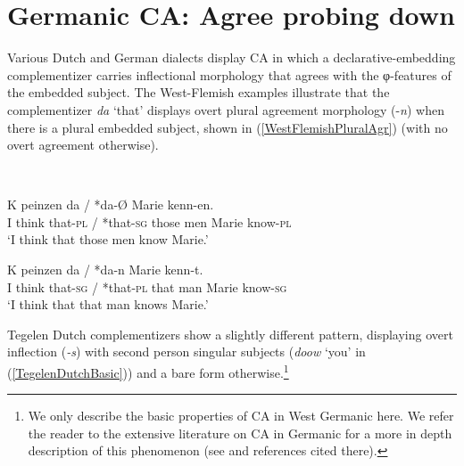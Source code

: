 \documentclass[output=paper
,modfonts
,nonflat
]{langsci/langscibook}
\begin{document}
\section{Germanic CA: Agree probing down} \label{GermanicCA}

Various Dutch and German dialects display CA in which a declarative-embedding complementizer carries inflectional morphology that agrees with the φ-features of the embedded subject. The West-Flemish examples illustrate that the complementizer \textit{da} `that' displays overt plural agreement morphology (-\textit{n}) when there is a plural embedded subject, shown in (\ref{WestFlemishPluralAgr}) (with no overt agreement otherwise). 

\ea \label{InitialWestFlemishExample}
\\
\begin{xlist}

\ex \label{WestFlemishPluralAgr}
\gll K peinzen da / *da{-\O}  Marie kenn-en.\\
I 	think	that-\textsc{pl}	/	*that-\textsc{sg}	{those men}	Marie	know-\textsc{pl} \\
\glt `I think that those men know Marie.' 	

\ex \label{WestFlemishNo3rdAgr}
\gll K peinzen da\circled{-\O} / *da-n  Marie kenn-t.\\
I think that-\textsc{sg} / *that-\textsc{pl} {that man} Marie know-\textsc{sg} \\
\glt `I think that that man knows Marie.' 	

\end{xlist}

\z
\noindent Tegelen Dutch complementizers show a slightly different pattern, displaying overt inflection (\textit{-s}) with second person singular subjects (\textit{doow} `you' in (\ref{TegelenDutchBasic})) and a bare form otherwise.\footnote{We only describe the basic properties of CA in West Germanic here. We refer the reader to the extensive literature on CA in Germanic for a more in depth description of this phenomenon (see \citealt{vanKoppen:2017} and references cited there).}
\end{document}
